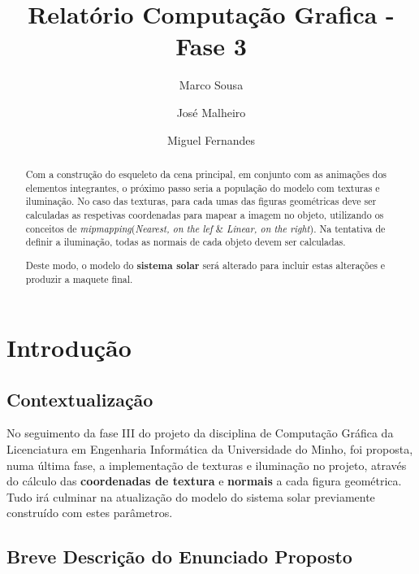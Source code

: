 \documentclass[runningheads]{llncs}
\begin{document}
%
\title{Relatório Computação Grafica - Fase 3}
\author{Marco Sousa \and
    José Malheiro \and
    Miguel Fernandes}
%
%
\maketitle              %
%
\begin{abstract}
    Com a construção do esqueleto da cena principal, em conjunto com as animações
    dos elementos integrantes, o próximo passo seria a população do modelo
    com texturas e iluminação.
    No caso das texturas, para cada umas das figuras geométricas deve ser 
    calculadas as respetivas coordenadas para mapear a imagem no objeto,
    utilizando os conceitos de \textit{mipmapping}(\textit{Nearest, on the lef} 
    \& \textit{Linear, on the right}).
    Na tentativa de definir a iluminação, todas as normais de cada objeto devem 
    ser calculadas.

    Deste modo, o modelo do \textbf{sistema solar} será alterado 
    para incluir estas alterações e produzir a maquete final.
    
    \end{abstract}
    \section{Introdução}
    \subsection{Contextualização}
    No seguimento da fase III do projeto da disciplina de Computação Gráfica 
    da Licenciatura em Engenharia Informática da Universidade do Minho, 
    foi proposta, numa última fase, a implementação de texturas e iluminação no projeto,
    através do cálculo das \textbf{coordenadas de textura} e \textbf{normais}
    a cada figura geométrica. 
    Tudo irá culminar na atualização do modelo do sistema solar
    previamente construído com estes parâmetros.
    
    \subsection{Breve Descrição do Enunciado Proposto}
    
\end{document}
